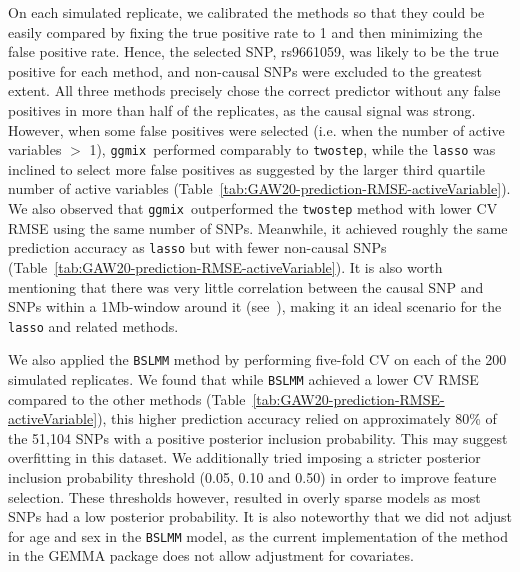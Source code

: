 \documentclass[10pt,letterpaper]{article}
\newcommand{\ggmix}{\texttt{ggmix}}
\begin{document}
On each simulated replicate, we calibrated the methods so that they could be easily compared by fixing the true positive rate to 1 and then minimizing the false positive rate. Hence, the selected SNP, rs9661059, was likely to be the true positive for each method, and non-causal SNPs were excluded to the greatest extent.
All three methods precisely chose the correct predictor without any false positives in more than half of the replicates, as the causal signal was strong. However, when some false positives were selected (i.e. when the number of active variables $>$ 1), \ggmix ~performed comparably to \texttt{twostep}, while the \texttt{lasso} was inclined to select more false positives as suggested by the larger third quartile number of active variables (Table~\ref{tab:GAW20-prediction-RMSE-activeVariable}).
We also observed that \ggmix ~outperformed the \texttt{twostep} method with lower CV RMSE using the same number of SNPs. Meanwhile, it achieved roughly the same prediction accuracy as \texttt{lasso} but with fewer non-causal SNPs (Table~\ref{tab:GAW20-prediction-RMSE-activeVariable}). It is also worth mentioning that there was very little correlation between the causal SNP and SNPs within a 1Mb-window around it (see~), making it an ideal scenario for the \texttt{lasso} and related methods.

We also applied the \texttt{BSLMM} method by performing five-fold CV on each of the 200 simulated replicates. 
We found that while \texttt{BSLMM} achieved a lower CV RMSE compared to the other methods (Table~\ref{tab:GAW20-prediction-RMSE-activeVariable}), this higher prediction accuracy relied on approximately 80\% of the 51,104 SNPs with a positive posterior inclusion probability. 
This may suggest overfitting in this dataset. 
We additionally tried imposing a stricter posterior inclusion probability threshold (0.05, 0.10 and 0.50) in order to improve feature selection. These thresholds however, resulted in overly sparse models as most SNPs had a low posterior probability.
It is also noteworthy that we did not adjust for age and sex in the \texttt{BSLMM} model, as the current implementation of the method in the GEMMA package does not allow adjustment for covariates.


\end{document}
